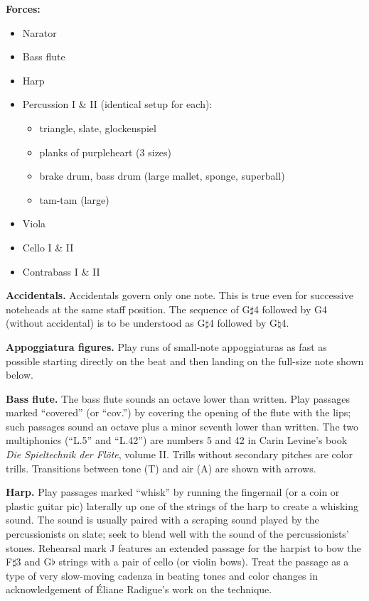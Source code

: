 \textbf{Forces:}

\begin{itemize} \itemsep2pt
\item Narator
\item Bass flute
\item Harp
\item Percussion I \& II (identical setup for each):
    \begin{itemize}
    \item triangle, slate, glockenspiel
    \item planks of purpleheart (3 sizes)
    \item brake drum, bass drum (large mallet, sponge, superball)
    \item tam-tam (large)
    \end{itemize}
\item Viola
\item Cello I \& II
\item Contrabass I \& II
\end{itemize}

\textbf{Accidentals.} Accidentals govern only one note. This is true even for
successive noteheads at the same staff position. The sequence of G$\sharp$4
followed by G4 (without accidental) is to be understood as G$\sharp$4 followed
by G$\natural$4.

\textbf{Appoggiatura figures.} Play runs of small-note appoggiaturas as fast as
possible starting directly on the beat and then landing on the full-size note
shown below.

\textbf{Bass flute.} The bass flute sounds an octave lower than written. Play
passages marked ``covered'' (or ``cov.'') by covering the opening of the flute
with the lips; such passages sound an octave plus a  minor seventh lower than
written. The two multiphonics (``L.5'' and ``L.42'') are numbers 5 and 42 in
Carin Levine's book \textit{Die Spieltechnik der Fl\"{o}te}, volume II. Trills
without secondary pitches are color trills. Transitions between tone (T) and
air (A) are shown with arrows.

\textbf{Harp.} Play passages marked ``whisk'' by running the fingernail (or a
coin or plastic guitar pic) laterally up one of the strings of the harp to
create a whisking sound. The sound is usually paired with a scraping sound
played by the percussionists on slate; seek to blend well with the sound of the
percussionists' stones. Rehearsal mark J features an extended passage for the
harpist to bow the F$\sharp$3 and G$\flat$ strings with a pair of cello (or
violin bows). Treat the passage as a type of very slow-moving cadenza in
beating tones and color changes in acknowledgement of \'{E}liane Radigue's work
on the technique.

